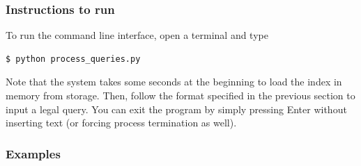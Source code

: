 \subsubsection{Instructions to run}

To run the command line interface, open a terminal and type
\begin{lstlisting}
$ python process_queries.py
\end{lstlisting}
Note that the system takes some seconds at the beginning to load the index in memory from storage. Then, follow the format specified in the previous section to input a legal query. You can exit the program by simply pressing Enter without inserting text (or forcing process termination as well).


\subsubsection{Examples}